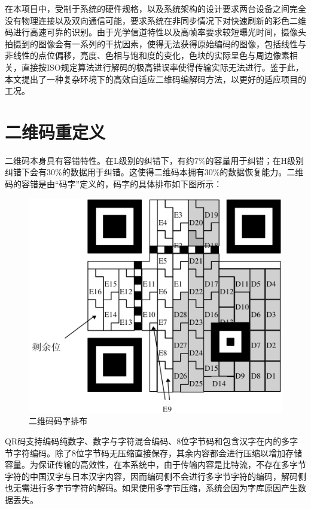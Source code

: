 \label{cha:dev}

在本项目中，受制于系统的硬件规格，以及系统架构的设计要求两台设备之间完全没有物理连接以及双向通信可能，要求系统在非同步情况下对快速刷新的彩色二维码进行高速可靠的识别。由于光学信道特性以及高帧率要求较短曝光时间，摄像头拍摄到的图像会有一系列的干扰因素，使得无法获得原始编码的图像，包括线性与非线性的点位偏移，亮度、色相与饱和度的变化，色块的实际呈色与周边像素相关，直接按ISO规定算法进行解码的极高错误率使得传输实际无法进行。鉴于此，本文提出了一种复杂环境下的高效自适应二维码编解码方法，以更好的适应项目的工况。

\section{二维码重定义}

二维码本身具有容错特性。在L级别的纠错下，有约7\%的容量用于纠错；在H级别纠错下会有30\%的数据用于纠错。这使得二维码本拥有30\%的数据恢复能力。二维码的容错是由“码字”定义的，码字的具体排布如下图所示：

\begin{figure}[!htbp]
\centering
\includegraphics[scale=0.6]{figures/QR_Word.png}
\caption{二维码码字排布}
\end{figure}

QR码支持编码纯数字、数字与字符混合编码、8位字节码和包含汉字在内的多字节字符编码。除了8位字节码无压缩直接保存，其余内容都会进行压缩以增加存储容量。为保证传输的高效性，在本系统中，由于传输内容是比特流，不存在多字节字符的中国汉字与日本汉字内容，因而编码侧不会进行多字节字符的编码，解码侧也无需进行多字节字符的解码。如果使用多字节压缩，系统会因为字库原因产生数据丢失。

